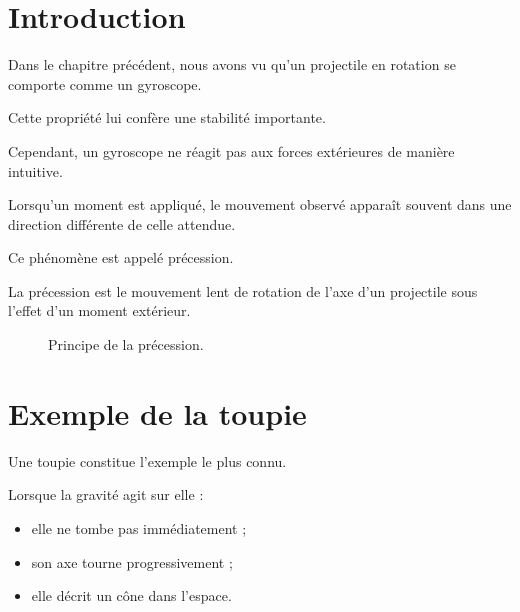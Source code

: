 
\section{Introduction}

Dans le chapitre précédent, nous avons vu qu'un projectile en rotation se
comporte comme un gyroscope.

Cette propriété lui confère une stabilité importante.

Cependant, un gyroscope ne réagit pas aux forces extérieures de manière
intuitive.

Lorsqu'un moment est appliqué, le mouvement observé apparaît souvent dans une
direction différente de celle attendue.

Ce phénomène est appelé précession.

\begin{aretenir}

La précession est le mouvement lent de rotation de l'axe d'un projectile sous
l'effet d'un moment extérieur.

\end{aretenir}

\begin{figure}[htbp]
\centering
{}
\caption{Principe de la précession.}
\label{fig:precession}
\end{figure}

\section{Exemple de la toupie}

Une toupie constitue l'exemple le plus connu.

Lorsque la gravité agit sur elle :

\begin{itemize}
    \item elle ne tombe pas immédiatement ;
    \item son axe tourne progressivement ;
    \item elle décrit un cône dans l'espace.
\end{itemize}

